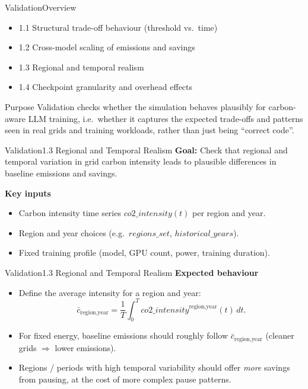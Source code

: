 \begin{frame}{Validation}{Overview}
  \begin{itemize}
    \item 1.1 Structural trade-off behaviour (threshold vs.\ time)
    \item 1.2 Cross-model scaling of emissions and savings
    \item 1.3 Regional and temporal realism
    \item 1.4 Checkpoint granularity and overhead effects
  \end{itemize}
  \vspace{0.5cm}
  \begin{block}{Purpose}
    Validation checks whether the simulation behaves plausibly for
    carbon-aware LLM
    training, i.e.\ whether it captures the expected trade-offs and patterns
    seen in real grids and training workloads, rather than just being
    ``correct code''.
  \end{block}
\end{frame}


\begin{frame}{Validation}{1.3 Regional and Temporal Realism}
  \textbf{Goal:} Check that regional and temporal variation in grid
  carbon intensity
  leads to plausible differences in baseline emissions and savings.
  \vspace{0.3cm}

  \textbf{Key inputs}
  \begin{itemize}
    \item Carbon intensity time series $\mathit{co2\_intensity}(t)$
      per region and year.
    \item Region and year choices (e.g.\ $\mathit{regions\_set}$,
      $\mathit{historical\_years}$).
    \item Fixed training profile (model, GPU count, power, training duration).
  \end{itemize}
\end{frame}

\begin{frame}{Validation}{1.3 Regional and Temporal Realism}
  \textbf{Expected behaviour}
  \begin{itemize}
    \item Define the average intensity for a region and year:
      \[
        \bar{c}_{\text{region,year}} =
        \frac{1}{T} \int_0^T
        \mathit{co2\_intensity}^{\text{region,year}}(t)\, dt.
      \]
    \item For fixed energy, baseline emissions should roughly follow
      $\bar{c}_{\text{region,year}}$ (cleaner grids $\Rightarrow$
      lower emissions).
    \item Regions / periods with high temporal variability should offer
      \emph{more} savings from pausing, at the cost of more complex
      pause patterns.
  \end{itemize}
\end{frame}

